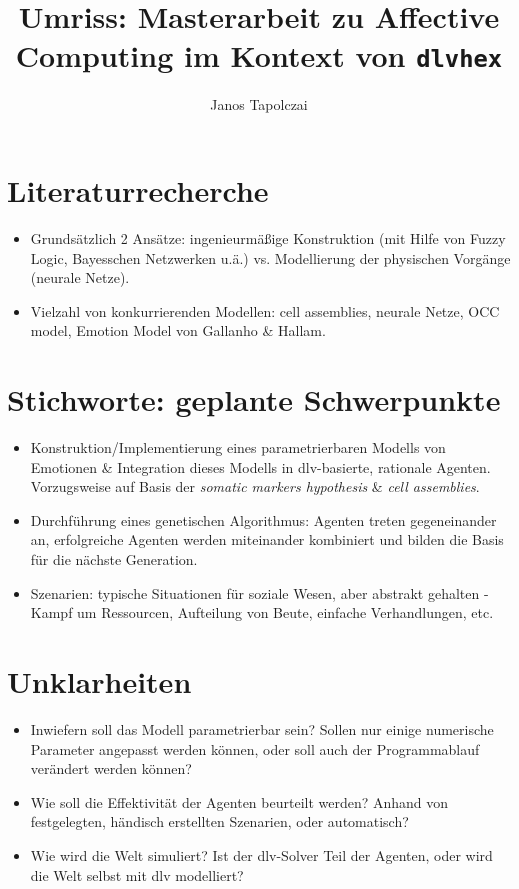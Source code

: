 \documentclass[]{scrartcl}
\title{Umriss: Masterarbeit zu Affective Computing im Kontext von \texttt{dlvhex}}
\author{Janos Tapolczai}
\begin{document}
\maketitle

\begin{abstract}

\end{abstract}

\section {Literaturrecherche}

\begin{itemize}
	\item Grundsätzlich 2 Ansätze: ingenieurmäßige Konstruktion (mit Hilfe von Fuzzy Logic, Bayesschen Netzwerken u.ä.) vs. Modellierung der physischen Vorgänge (neurale Netze).
	\item Vielzahl von konkurrierenden Modellen: cell assemblies, neurale Netze, OCC model, Emotion Model von Gallanho \& Hallam.
\end{itemize}

\section{Stichworte: geplante Schwerpunkte}

\begin{itemize}
	\item Konstruktion/Implementierung eines parametrierbaren Modells von Emotionen \& Integration dieses Modells in dlv-basierte, rationale Agenten.\\
	Vorzugsweise auf Basis der {\em somatic markers hypothesis} \& {\em cell assemblies}.
	\item Durchführung eines genetischen Algorithmus: Agenten treten gegeneinander an, erfolgreiche Agenten werden miteinander kombiniert und bilden die Basis für die nächste Generation.
	\item Szenarien: typische Situationen für soziale Wesen, aber abstrakt gehalten - Kampf um Ressourcen, Aufteilung von Beute, einfache Verhandlungen, etc.
\end{itemize}

\section{Unklarheiten}

\begin{itemize}
	\item Inwiefern soll das Modell parametrierbar sein? Sollen nur einige numerische Parameter angepasst werden können, oder soll auch der Programmablauf verändert werden können?
	\item Wie soll die Effektivität der Agenten beurteilt werden? Anhand von festgelegten, händisch erstellten Szenarien, oder automatisch?
	\item Wie wird die Welt simuliert? Ist der dlv-Solver Teil der Agenten, oder wird die Welt selbst mit dlv modelliert?
\end{itemize}
\end{document}
